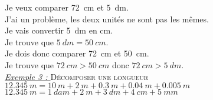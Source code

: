 \documentclass[12pt]{memoir}
\begin{document}
Je veux comparer \qty{72}{cm} et \qty{5}{dm}.\\
J'ai un problème, les deux unités ne sont pas les mêmes.\\
Je vais convertir \qty{5}{dm} en \unit{cm}.\\
Je trouve que $\qty{5}{dm} = \qty{50}{cm}$.\\
Je dois donc comparer \qty{72}{cm} et \qty{50}{cm}.\\
Je trouve que $\qty{72}{cm} > \qty{50}{cm}$ donc $\qty{72}{cm} > \qty{5}{dm}$.\\


\textit{\underline{Exemple 3 : }} \textsc{Décomposer une longueur}\\[-0.2cm]

$\qty{12,345}{m} = \qty{10}{m} + \qty{2}{m} + \qty{0,3}{m} + \qty{0,04}{m} + \qty{0,005}{m}$\\
$\qty{12,345}{m} = \qty{1}{dam} + \qty{2}{m} + \qty{3}{dm} + \qty{4}{cm} + \qty{5}{mm}$\\

\clearpage

\newcommand{\dotss}{..................}
\newcommand{\dotsss}{............................................}
\end{document}

